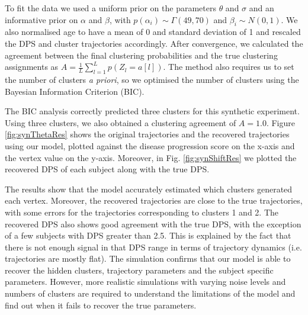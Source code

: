 \documentclass{llncs}
\begin{document}
To fit the data we used a uniform prior on the parameters $\theta$ and $\sigma$ and an informative prior on $\alpha$ and $\beta$, with $p(\alpha_i) \sim \Gamma(49,70)$ and $\beta_i \sim N(0,1)$. We also normalised age to have a mean of 0 and standard deviation of 1 and rescaled the DPS and cluster trajectories accordingly. After convergence, we calculated the agreement between the final clustering probabilities and the true clustering assignments as $A = \frac{1}{L}\sum_{l=1}^L p(Z_l = a[l])$. The method also requires us to set the number of clusters \emph{a priori}, so we optimised the number of clusters using the Bayesian Information Criterion (BIC). 

The BIC analysis correctly predicted three clusters for this synthetic experiment. Using three clusters, we also obtained a clustering agreement of $A = 1.0$. Figure \ref{fig:synThetaRes} shows the original trajectories and the recovered trajectories using our model, plotted against the disease progression score on the x-axis and the vertex value on the y-axis. Moreover, in Fig. \ref{fig:synShiftRes} we plotted the recovered DPS of each subject along with the true DPS. 

The results show that the model accurately estimated which clusters generated each vertex. Moreover, the recovered trajectories are close to the true trajectories, with some errors for the trajectories corresponding to clusters 1 and 2. The recovered DPS also shows good agreement with the true DPS, with the exception of a few subjects with DPS greater than 2.5. This is explained by the fact that there is not enough signal in that DPS range in terms of trajectory dynamics (i.e. trajectories are mostly flat). The simulation confirms that our model is able to recover the hidden clusters, trajectory parameters and the subject specific parameters. However, more realistic simulations with varying noise levels and numbers of clusters are required to understand the limitations of the model and find out when it fails to recover the true parameters. 
\end{document}
